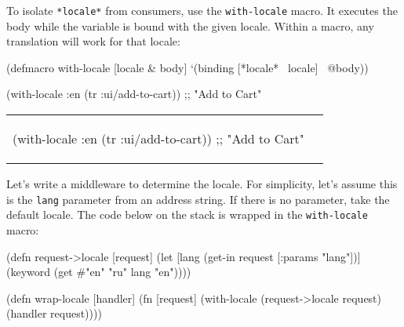 
To isolate \verb|*locale*| from consumers, use the \verb|with-locale| macro.
It executes the body while the variable is bound with the given locale.
Within a macro, any translation will work for that locale:

\begin{clojure}
(defmacro with-locale
  [locale & body]
  `(binding [*locale* ~locale]
     ~@body))
\end{clojure}

\ifx\DEVICETYPE\MOBILE

\begin{clojure}
(with-locale :en
  (tr :ui/add-to-cart))
;; "Add to Cart"
\end{clojure}

\splitter


\else

\noindent
\begin{tabular}{ @{}p{5cm} @{}p{5cm} }

\begin{clojure}
(with-locale :en
  (tr :ui/add-to-cart))
;; "Add to Cart"
\end{clojure}

&



\end{tabular}

\fi

Let's write a middleware to determine the locale.
For simplicity, let's assume this is the \verb|lang| parameter from an address string.
If there is no parameter, take the default locale.
The code below on the stack is wrapped in the \verb|with-locale| macro:

\ifx\DEVICETYPE\MOBILE

\begin{clojure}
(defn request->locale [request]
  (let [lang (get-in request
               [:params "lang"])]
    (keyword
      (get #{"en" "ru"} lang "en"))))

(defn wrap-locale [handler]
  (fn [request]
    (with-locale
      (request->locale request)
      (handler request))))
\end{clojure}

